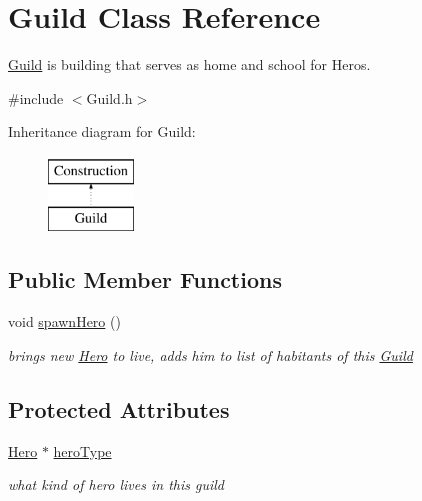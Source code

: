 \hypertarget{class_guild}{}\section{Guild Class Reference}
\label{class_guild}


\hyperlink{class_guild}{Guild} is building that serves as home and school for Heros.  




{\ttfamily \#include $<$Guild.\+h$>$}

Inheritance diagram for Guild\+:\begin{figure}[H]
\begin{center}
\leavevmode
\includegraphics[height=2.000000cm]{class_guild}
\end{center}
\end{figure}
\subsection*{Public Member Functions}
\begin{DoxyCompactItemize}
\item 
void \hyperlink{class_guild_a5a671abed58577f1072bb3ce589d6f24}{spawn\+Hero} ()\hypertarget{class_guild_a5a671abed58577f1072bb3ce589d6f24}{}\label{class_guild_a5a671abed58577f1072bb3ce589d6f24}

\begin{DoxyCompactList}\small\item\em brings new \hyperlink{class_hero}{Hero} to live, adds him to list of habitants of this \hyperlink{class_guild}{Guild} \end{DoxyCompactList}\end{DoxyCompactItemize}
\subsection*{Protected Attributes}
\begin{DoxyCompactItemize}
\item 
\hyperlink{class_hero}{Hero} $\ast$ \hyperlink{class_guild_a96e8022f289bed1be880b03302d6de64}{hero\+Type}\hypertarget{class_guild_a96e8022f289bed1be880b03302d6de64}{}\label{class_guild_a96e8022f289bed1be880b03302d6de64}

\begin{DoxyCompactList}\small\item\em what kind of hero lives in this guild \end{DoxyCompactList}\end{DoxyCompactItemize}


